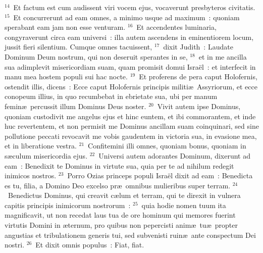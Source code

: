 ${}^{14}$~Et factum est cum audissent viri vocem ejus, vocaverunt presbyteros civitatis.
${}^{15}$~Et concurrerunt ad eam omnes, a minimo usque ad maximum~: quoniam sperabant eam jam non esse venturam.
${}^{16}$~Et accendentes luminaria, congyraverunt circa eam universi~: illa autem ascendens in eminentiorem locum, jussit fieri silentium. Cumque omnes tacuissent,
${}^{17}$~dixit Judith~: Laudate Dominum Deum nostrum, qui non deseruit sperantes in se,
${}^{18}$~et in me ancilla sua adimplevit misericordiam suam, quam promisit domui Isra\"el~: et interfecit in manu mea hostem populi sui hac nocte.
${}^{19}$~Et proferens de pera caput Holofernis, ostendit illis, dicens~: Ecce caput Holofernis principis militi\ae\ Assyriorum, et ecce conopeum illius, in quo recumbebat in ebrietate sua, ubi per manum femin\ae\ percussit illum Dominus Deus noster.
${}^{20}$~Vivit autem ipse Dominus, quoniam custodivit me angelus ejus et hinc euntem, et ibi commorantem, et inde huc revertentem, et non permisit me Dominus ancillam suam coinquinari, sed sine pollutione peccati revocavit me vobis gaudentem in victoria sua, in evasione mea, et in liberatione vestra.
${}^{21}$~Confitemini illi omnes, quoniam bonus, quoniam in s\ae culum misericordia ejus.
${}^{22}$~Universi autem adorantes Dominum, dixerunt ad eam~: Benedixit te Dominus in virtute sua, quia per te ad nihilum redegit inimicos nostros.
${}^{23}$~Porro Ozias princeps populi Isra\"el dixit ad eam~: Benedicta es tu, filia, a Domino Deo excelso pr\ae\ omnibus mulieribus super terram.
${}^{24}$~Benedictus Dominus, qui creavit c\ae lum et terram, qui te direxit in vulnera capitis principis inimicorum nostrorum~:
${}^{25}$~quia hodie nomen tuum ita magnificavit, ut non recedat laus tua de ore hominum qui memores fuerint virtutis Domini in \ae ternum, pro quibus non pepercisti anim\ae\ tu\ae\ propter angustias et tribulationem generis tui, sed subvenisti ruin\ae\ ante conspectum Dei nostri.
${}^{26}$~Et dixit omnis populus~: Fiat, fiat.


